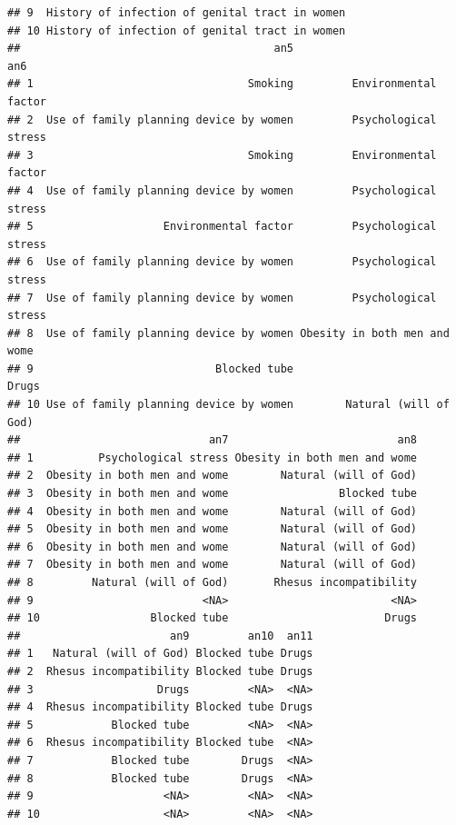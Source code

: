 \documentclass[
]{article}
\begin{document}
\begin{verbatim}
## 9  History of infection of genital tract in women
## 10 History of infection of genital tract in women
##                                       an5                          an6
## 1                                 Smoking         Environmental factor
## 2  Use of family planning device by women         Psychological stress
## 3                                 Smoking         Environmental factor
## 4  Use of family planning device by women         Psychological stress
## 5                    Environmental factor         Psychological stress
## 6  Use of family planning device by women         Psychological stress
## 7  Use of family planning device by women         Psychological stress
## 8  Use of family planning device by women Obesity in both men and wome
## 9                            Blocked tube                        Drugs
## 10 Use of family planning device by women        Natural (will of God)
##                             an7                          an8
## 1          Psychological stress Obesity in both men and wome
## 2  Obesity in both men and wome        Natural (will of God)
## 3  Obesity in both men and wome                 Blocked tube
## 4  Obesity in both men and wome        Natural (will of God)
## 5  Obesity in both men and wome        Natural (will of God)
## 6  Obesity in both men and wome        Natural (will of God)
## 7  Obesity in both men and wome        Natural (will of God)
## 8         Natural (will of God)       Rhesus incompatibility
## 9                          <NA>                         <NA>
## 10                 Blocked tube                        Drugs
##                       an9         an10  an11
## 1   Natural (will of God) Blocked tube Drugs
## 2  Rhesus incompatibility Blocked tube Drugs
## 3                   Drugs         <NA>  <NA>
## 4  Rhesus incompatibility Blocked tube Drugs
## 5            Blocked tube         <NA>  <NA>
## 6  Rhesus incompatibility Blocked tube  <NA>
## 7            Blocked tube        Drugs  <NA>
## 8            Blocked tube        Drugs  <NA>
## 9                    <NA>         <NA>  <NA>
## 10                   <NA>         <NA>  <NA>
\end{verbatim}
\end{document}
